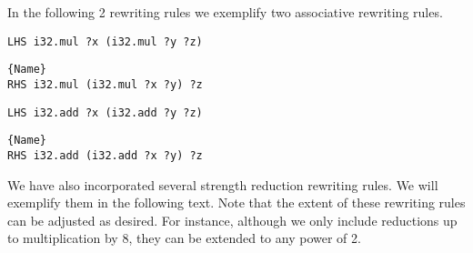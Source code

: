 In the following 2 rewriting rules we exemplify two associative rewriting rules.


\begin{minipage}{0.95\linewidth}
\begin{minipage}{0.49\linewidth}
    
    \lstset{
    language=ttt,
    style=watcode,
    basicstyle=\footnotesize\ttfamily,
    columns=fullflexible,
    breaklines=true}
    \begin{lstlisting}[]
LHS i32.mul ?x (i32.mul ?y ?z)
            \end{lstlisting}\vspace{-0.5cm}
    \noindent\hrulefill
        \lstset{
            language=ttt,
            style=watcode,
            basicstyle=\footnotesize\ttfamily,
            columns=fullflexible,
            breaklines=true}
            \vspace{-0.2cm}
            \begin{lstlisting}[numbers=none]{Name}
RHS i32.mul (i32.mul ?x ?y) ?z
    \end{lstlisting}
\end{minipage}
\begin{minipage}{0.49\linewidth}
    \lstset{
    language=ttt,
    style=watcode,
    basicstyle=\footnotesize\ttfamily,
    columns=fullflexible,
    breaklines=true}
    \begin{lstlisting}[]
LHS i32.add ?x (i32.add ?y ?z)
            \end{lstlisting}\vspace{-0.5cm}
    \noindent\hrulefill
        \lstset{
            language=ttt,
            style=watcode,
            basicstyle=\footnotesize\ttfamily,
            columns=fullflexible,
            breaklines=true}
            \vspace{-0.2cm}
            \begin{lstlisting}[numbers=none]{Name}
RHS i32.add (i32.add ?x ?y) ?z
    \end{lstlisting}
\end{minipage}    
\end{minipage}

We have also incorporated several strength reduction rewriting rules.
We will exemplify them in the following text.
Note that the extent of these rewriting rules can be adjusted as desired.
For instance, although we only include reductions up to multiplication by 8, they can be extended to any power of 2.

